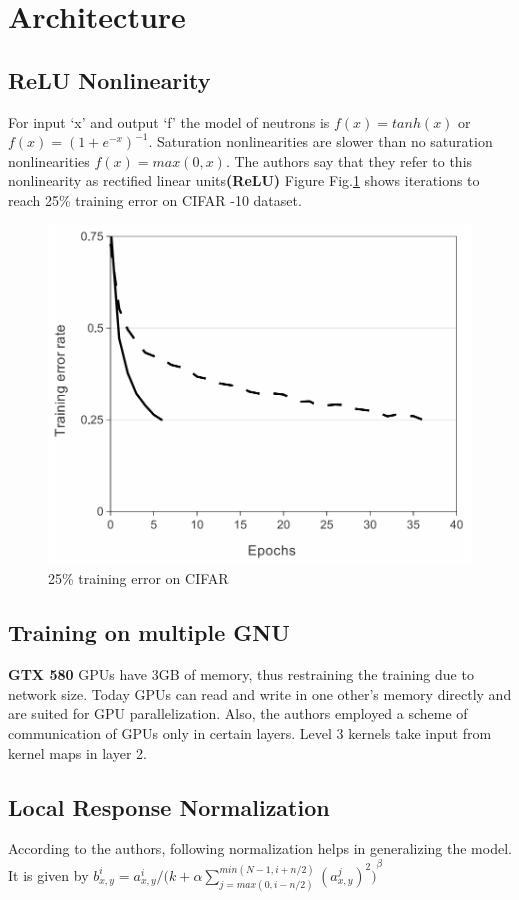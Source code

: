 \documentclass{article}
\begin{document}
\section{Architecture} 

\subsection{ReLU Nonlinearity}
For input ‘x’ and output ‘f’ the model of neutrons  is $f(x)=tanh(x)$ or
$f(x)=(1+e^{-x})^{-1}$.
Saturation nonlinearities are slower than no saturation nonlinearities $f(x)=max(0,x)$.
The authors say that they  refer to this nonlinearity as rectified linear units\textbf{(ReLU)}
Figure Fig.\ref{fig:my_label3} shows iterations to reach 25\% training error on CIFAR -10 dataset.
\begin{figure}[h]
 \centering
    \includegraphics[width=.5\textwidth,right]{pic.png}
    \caption{25\% training error on CIFAR}
    \label{fig:my_label3}
\end{figure}
\subsection{Training on multiple GNU}
\textbf{GTX 580} GPUs have 3GB of memory, thus restraining the training due to network size. Today GPUs can read and write in one other’s memory directly and are suited for GPU parallelization. Also, the authors employed a scheme of communication of GPUs only in certain layers.  Level 3 kernels take input from kernel maps in layer 2.
\subsection{Local Response Normalization}
According to the authors, following normalization helps in generalizing the model. It is given by \newline
$b^{i}_{x,y}= {a^{i}_{x,y}}/{(k+\alpha{\sum_{j=max(0,i-n/2)}^{min(N-1,i+n/2)}{(a_{x,y}^j)^2)}}^\beta}$
\vspace{0.2in}
\end{document}
